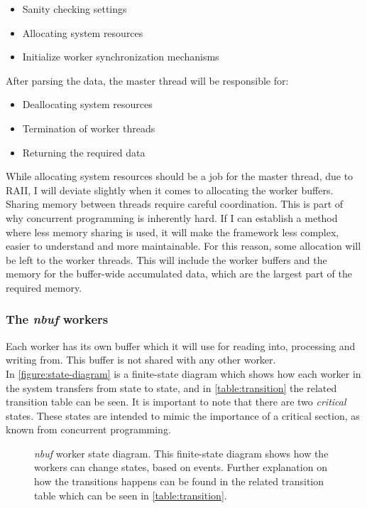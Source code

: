 \documentclass[a4paper]{article}
\newcommand{\nbuf}{\textit{nbuf} }
\begin{document}
\begin{itemize}
\item Sanity checking settings
\item Allocating system resources
\item Initialize worker synchronization mechanisms
\end{itemize} 

After parsing the data, the master thread will be responsible for:

\begin{itemize}
\item Deallocating system resources
\item Termination of worker threads
\item Returning the required data
\end{itemize} 

While allocating system resources should be a job for the master thread, due to RAII, I will deviate slightly when it comes to allocating the worker buffers. Sharing memory between threads require careful coordination. This is part of why concurrent programming is inherently hard. If I can establish a method where less memory sharing is used, it will make the framework less complex, easier to understand and more maintainable. For this reason, some allocation will be left to the worker threads. This will include the worker buffers and the memory for the buffer-wide accumulated data, which are the largest part of the required memory.



\subsubsection{The \nbuf workers}

Each worker has its own buffer which it will use for reading into, processing and writing from. This buffer is not shared with any other worker.\\

In \autoref{figure:state-diagram} is a finite-state diagram which shows how each worker in the system transfers from state to state, and in \autoref{table:transition} the related transition table can be seen. It is important to note that there are two \textit{critical} states. These states are intended to mimic the importance of a critical section, as known from concurrent programming.\\

\begin{figure}
	\begin{adjustwidth}{-0.5in}{-0.5in}
    \centering
    \def\svgwidth{\columnwidth}
    
  	\caption{\nbuf worker state diagram. This finite-state diagram shows how the workers can change states, based on events. Further explanation on how the transitions happens can be found in the related transition table which can be seen in \autoref{table:transition}.}
	\label{figure:state-diagram}
	\end{adjustwidth}
\end{figure}
\end{document}
